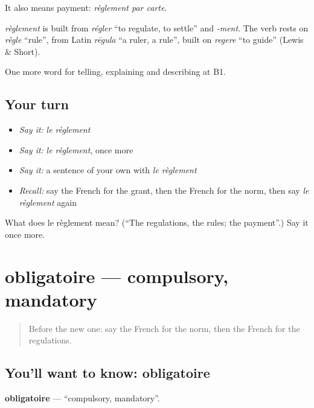 It also means payment: \emph{règlement par carte}.

\begin{cousinweb}
\emph{règlement} is built from \emph{régler} \textquotedblleft{}to regulate, to settle\textquotedblright{} and \emph{-ment}. The verb rests on \emph{règle} \textquotedblleft{}rule\textquotedblright{}, from Latin \emph{rēgula} \textquotedblleft{}a ruler, a rule\textquotedblright{}, built on \emph{regere} \textquotedblleft{}to guide\textquotedblright{} (Lewis \& Short).
\end{cousinweb}

\begin{grammarlens}[title={What you've built}]
One more word for telling, explaining and describing at B1.
\end{grammarlens}

\subsection*{Your turn}
\begin{itemize}
\raggedright
  \item \emph{Say it:} \emph{le règlement}
  \item \emph{Say it:} \emph{le règlement}, once more
  \item \emph{Say it:} a sentence of your own with \emph{le règlement}
  \item \emph{Recall:} say the French for the grant, then the French for the norm, then say \emph{le règlement} again
\end{itemize}

\begin{tcolorbox}[breakable,colback=teal!4,colframe=teal!35!black,title={Before you move on}]
What does le règlement mean? (\textquotedblleft{}The regulations, the rules; the payment\textquotedblright{}.) Say it once more.
\end{tcolorbox}
\section[obligatoire]{obligatoire — compulsory, mandatory}

\label{lesson:FR-C380-obligatoire}



\begin{quote}
Before the new one: say the French for the norm, then the French for the regulations.
\end{quote}

\subsection*{You'll want to know: obligatoire}
\textbf{obligatoire} — \textquotedblleft{}compulsory, mandatory\textquotedblright{}.

